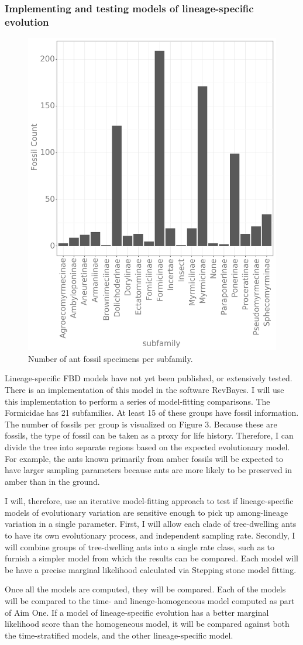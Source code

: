 \documentclass[]{article}
\begin{document}
\subsubsection*{Implementing and testing models of lineage-specific evolution}
  \begin{figure}
    \includegraphics[width=.5\textwidth]{Fig3.png}
     \caption{Number of ant fossil specimens per subfamily.}
\end{figure}
Lineage-specific FBD models have not yet been published, or extensively tested.
There is an implementation of this model in the software RevBayes.
I will use this implementation to perform a series of model-fitting comparisons. 
The Formicidae has 21 subfamilies.
At least 15 of these groups have fossil information.
The number of fossils per group is visualized on Figure 3.
Because these are fossils, the type of fossil can be taken as a proxy for life history.
Therefore, I can divide the tree into separate regions based on the expected evolutionary model.
For example, the ants known primarily from amber fossils will be expected to have larger sampling parameters because ants are more likely to be preserved in amber than in the ground. \par
I will, therefore, use an iterative model-fitting approach to test if lineage-specific models of evolutionary variation are sensitive enough to pick up among-lineage variation in a single parameter.
First, I will allow each clade of tree-dwelling ants to have its own evolutionary process, and independent sampling rate.
Secondly, I will combine groups of tree-dwelling ants into a single rate class, such as to furnish a simpler model from which the results can be compared. 
Each model will be have a precise marginal likelihood calculated via Stepping stone model fitting. \par
Once all the models are computed, they will be compared.
Each of the models will be compared to the time- and lineage-homogeneous model computed as part of Aim One.
If a model of lineage-specific evolution has a better marginal likelihood score than the homogeneous model, it will be compared against both the time-stratified models, and the other lineage-specific model. \par
\end{document}
